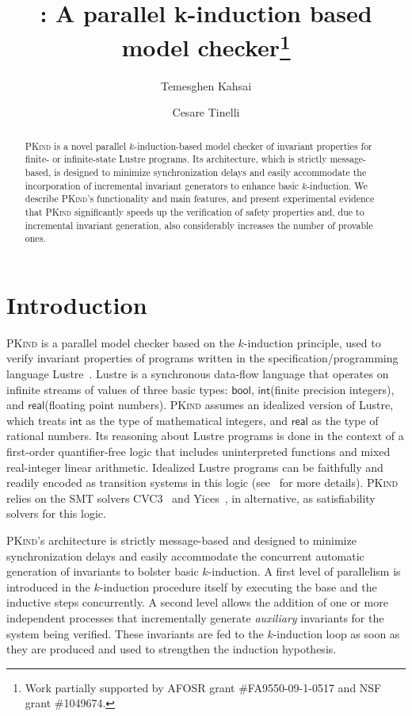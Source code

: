 \documentclass[submission,copyright,creativecommons]{eptcs}
\title{\PKind: A parallel k-induction based model checker\thanks{Work partially supported by AFOSR grant \#FA9550-09-1-0517 and NSF grant \#1049674.}}
\author{Temesghen Kahsai
\institute{The University of Iowa}
\email{temesghen-kahsaiazene@uiowa.edu}
\and
Cesare Tinelli
\institute{The University of Iowa}
\email{cesare-tinelli@uiowa.edu}
}
\newcommand{\PKind}{\textrm{\textsc{PKind}}\xspace}
\newcommand{\bool}{\ensuremath{\mathsf{bool}}\xspace}
\newcommand{\inte}{\ensuremath{\mathsf{int}}\xspace}
\newcommand{\real}{\ensuremath{\mathsf{real}}\xspace}
\begin{document}
\maketitle

\begin{abstract}
  \PKind is a novel parallel $k$-induction-based model checker 
of invariant properties
for finite- or infinite-state Lustre programs. Its architecture, which is
  strictly message-based, is designed to minimize synchronization
  delays and easily accommodate the incorporation of incremental
  invariant generators to enhance basic $k$-induction. 
We describe \PKind's functionality and main features, and
  present experimental evidence that \PKind significantly speeds up
  the verification of safety properties and, due to incremental
  invariant generation, also considerably increases the number of
  provable ones.
\end{abstract}

\section{Introduction}

\PKind is a parallel model checker based on the
$k$-induction principle, used to verify invariant
 properties of
programs written in the specification/programming language
Lustre~\cite{lustre}. Lustre is a synchronous data-flow language
that operates on infinite streams of values of three basic types: \bool,
\inte (finite precision integers), and \real (floating point numbers).
\PKind assumes an idealized version of Lustre, which treats \inte as the
type of mathematical integers, and \real as the type of rational
numbers.  
Its reasoning about Lustre programs is done in the context of 
a first-order quantifier-free logic 
that includes uninterpreted functions and mixed real-integer linear arithmetic. 
Idealized Lustre programs can be faithfully and readily encoded 
as transition systems in this logic  (see~\cite{hagen08} for more
details).  
\PKind relies on the SMT solvers CVC3~\cite{BarTin-CAV-07} and
Yices~\cite{DutDeM-RR-06}, in alternative, 
as satisfiability solvers for this logic.

\PKind's architecture is strictly message-based and designed to minimize synchronization delays and easily accommodate the
concurrent automatic generation of invariants to bolster basic
$k$-induction. A first level of parallelism is introduced in the
$k$-induction procedure itself by executing the base and the inductive
steps concurrently. A second level allows the addition
of one or more independent processes that incrementally generate
\emph{auxiliary} invariants for the system being verified. These invariants are fed to
the $k$-induction loop as soon as they are produced and used to
strengthen the induction hypothesis. 
\end{document}
